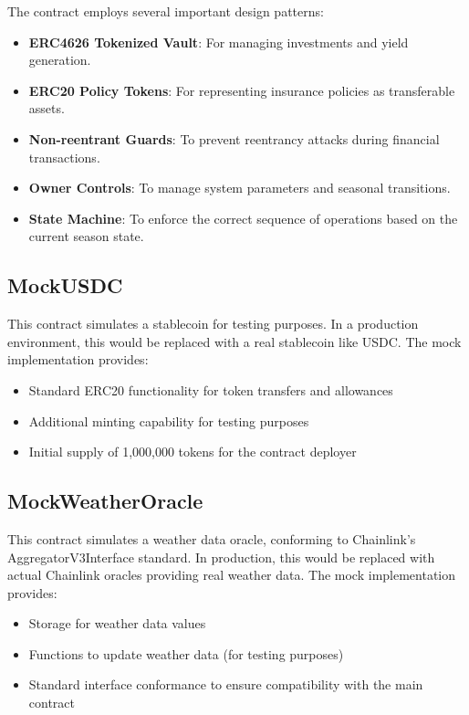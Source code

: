 \documentclass[11pt,a4paper]{article}
\begin{document}
	The contract employs several important design patterns:
	\begin{itemize}
	    \item \textbf{ERC4626 Tokenized Vault}: For managing investments and yield generation.
	    \item \textbf{ERC20 Policy Tokens}: For representing insurance policies as transferable assets.
	    \item \textbf{Non-reentrant Guards}: To prevent reentrancy attacks during financial transactions.
	    \item \textbf{Owner Controls}: To manage system parameters and seasonal transitions.
	    \item \textbf{State Machine}: To enforce the correct sequence of operations based on the current season state.
	\end{itemize}

	\subsection{MockUSDC}\label{subsec:analysis-mock-usdc}
	This contract simulates a stablecoin for testing purposes.
    In a production environment, this would be replaced with a real stablecoin like USDC. The mock implementation provides:

	\begin{itemize}
	    \item Standard ERC20 functionality for token transfers and allowances
	    \item Additional minting capability for testing purposes
	    \item Initial supply of 1,000,000 tokens for the contract deployer
	\end{itemize}

	\subsection{MockWeatherOracle}\label{subsec:analysis-mock-weather-oracle}
	This contract simulates a weather data oracle, conforming to Chainlink's AggregatorV3Interface standard.
    In production, this would be replaced with actual Chainlink oracles providing real weather data.
    The mock implementation provides:

	\begin{itemize}
	    \item Storage for weather data values
	    \item Functions to update weather data (for testing purposes)
	    \item Standard interface conformance to ensure compatibility with the main contract
	\end{itemize}
\end{document}
